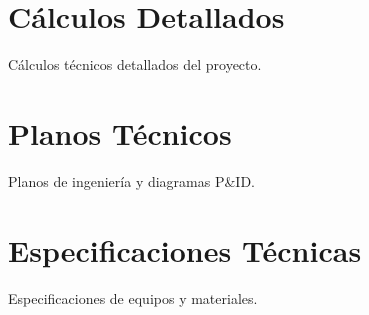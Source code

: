 \appendix
\section{Cálculos Detallados}
\label{appendix:calculations}

Cálculos técnicos detallados del proyecto.

\section{Planos Técnicos}
\label{appendix:drawings}

Planos de ingeniería y diagramas P\&ID.

\section{Especificaciones Técnicas}
\label{appendix:specs}

Especificaciones de equipos y materiales.